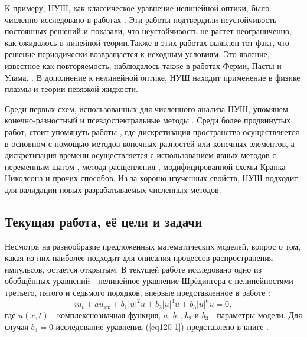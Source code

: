 \documentclass[14pt,a4paper]{extreport}
\begin{document}
			К примеру, НУШ, как классическое уравнение нелинейной оптики, было численно исследовано в работах \cite{Rad04,Rad05}. Эти работы подтвердили неустойчивость постоянных решений и показали, что неустойчивость не растет неограниченно, как ожидалось в линейной теории.Также в этих работах выявлен тот факт, что решение периодически возвращается к исходным условиям. Это явление, известное как повторяемость, наблюдалось также в работах Ферми, Пасты и Улама. \cite{Rad06}. В дополнение к нелинейной оптике, НУШ находит применение в физике плазмы и теории невязкой жидкости.

			Среди первых схем, использованных для численного анализа НУШ, упомянем конечно-разностный и псевдоспектральные методы \cite{Rad04,Rad07}. Среди более продвинутых работ, стоит упомянуть работы \cite{Rad08,Rad09,Rad010,Rad011,Rad012,Rad013,QIN2022126580}, где дискретизация пространства осуществляется в основном с помощью методов конечных разностей или конечных элементов, а дискретизация времени осуществляется с использованием явных методов с переменным шагом \cite{Rad08,Rad09}, метода расщепления \cite{Rad010}, модифицированной схемы Кранка-Николсона \cite{Rad011} и прочих способов. Из-за хорошо изученных свойств, НУШ подходит для валидации новых разрабатываемых численных методов.

		\subsection{Текущая работа, её цели и задачи}\label{ch120}
			Несмотря на разнообразие предложенных математических моделей, вопрос о том, какая из них наиболее подходит для описания процессов распространения импульсов, остается открытым.
			В текущей работе исследовано одно из обобщённых уравнений - нелинейное уравнение Шрёдингера с нелинейностями третьего, пятого и седьмого порядков, впервые представленное в работе \cite{Rad3}:
			\begin{equation}\label{eq120-1}
				iu_{t}+au_{xx}+b_{1}|u|^2 u+b_{2}|u|^4 u+b_{3}|u|^6 u=0,
			\end{equation}
			где \(u(x,t)\) - комплекснозначная функция, \(a\), \(b_{1}\), \(b_{2}\) и \(b_{3}\) - параметры модели. Для случая \(b_{3}=0\) исследование уравнения (\ref{eq120-1}) представлено в книге \cite{Rad02}.
\end{document}
